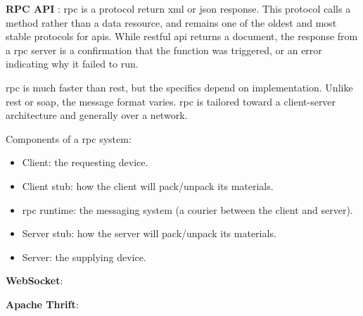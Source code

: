 \begin{multicols}{2} %
      \textbf{RPC API} : \acrshort{rpc} is a protocol return \acrshort{xml} or \acrshort{json} response. This protocol 
      calls a method rather than a data resource, and remains one of the oldest and most stable protocols for 
      \acrshort{api}s. While \acrshort{rest}ful \acrshort{api} returns a document, the response from a \acrshort{rpc} 
      server is a confirmation that the function was triggered, or an error indicating  why it failed to run. 
      
      \acrshort{rpc} is much faster than \acrshort{rest}, but the specifics depend on implementation. Unlike 
      \acrshort{rest} or \acrshort{soap}, the message format varies. \acrshort{rpc} is tailored toward a client-server
      architecture and generally over a network. 

      Components of a \acrshort{rpc} system:
      \begin{itemize}[label=$\star$]
            \item Client: the requesting device.
            \item Client stub: how the client will pack/unpack its materials.
            \item \acrshort{rpc} runtime: the messaging system (a courier between the client and server).
            \item Server stub: how the server will pack/unpack its materials.
            \item Server: the supplying device.
      \end{itemize}
      \textbf{WebSocket}: 

      \textbf{Apache Thrift}: 


\end{multicols}
